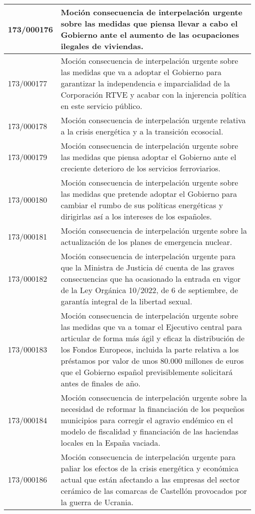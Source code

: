 {\begin{table}[H]
\begin{center}
\begin{tabularx}{\linewidth}{| l | X |}
\hline
173/000176 & Moción consecuencia de interpelación urgente sobre las medidas que piensa llevar a cabo el Gobierno ante el aumento de las ocupaciones ilegales de viviendas. \\
\hline
173/000177 & Moción consecuencia de interpelación urgente sobre las medidas que va a adoptar el Gobierno para garantizar la independencia e imparcialidad de la Corporación RTVE y acabar con la injerencia política en este servicio público. \\
\hline
173/000178 & Moción consecuencia de interpelación urgente relativa a la crisis energética y a la transición ecosocial. \\
\hline
173/000179 & Moción consecuencia de interpelación urgente sobre las medidas que piensa adoptar el Gobierno ante el creciente deterioro de los servicios ferroviarios. \\
\hline
173/000180 & Moción consecuencia de interpelación urgente sobre las medidas que pretende adoptar el Gobierno para cambiar el rumbo de sus políticas energéticas y dirigirlas así a los intereses de los españoles. \\
\hline
173/000181 & Moción consecuencia de interpelación urgente sobre la actualización de los planes de emergencia nuclear. \\
\hline
173/000182 & Moción consecuencia de interpelación urgente para que la Ministra de Justicia dé cuenta de las graves consecuencias que ha ocasionado la entrada en vigor de la Ley Orgánica 10/2022, de 6 de septiembre, de garantía integral de la libertad sexual. \\
\hline
173/000183 & Moción consecuencia de interpelación urgente sobre las medidas que va a tomar el Ejecutivo central para articular de forma más ágil y eficaz la distribución de los Fondos Europeos, incluida la parte relativa a los préstamos por valor de unos 80.000 millones de euros que el Gobierno español previsiblemente solicitará antes de finales de año. \\
\hline
173/000184 & Moción consecuencia de interpelación urgente sobre la necesidad de reformar la financiación de los pequeños municipios para corregir el agravio endémico en el modelo de fiscalidad y financiación de las haciendas locales en la España vaciada. \\
\hline
173/000186 & Moción consecuencia de interpelación urgente para paliar los efectos de la crisis energética y económica actual que están afectando a las empresas del sector cerámico de las comarcas de Castellón provocados por la guerra de Ucrania. \\

\end{tabularx}
\end{center}
\end{table}}
